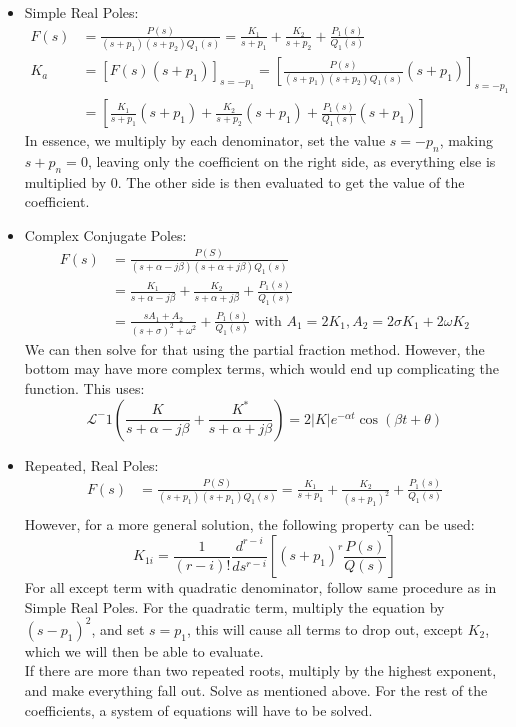 \documentclass[nobib]{tufte-handout}
\begin{document}
\begin{itemize}
    \item Simple Real Poles:
          \begin{align*}
              F(s) & = \frac{P(s)}{(s+p_1)(s+p_2)Q_1(s)} = \frac{K_1}{s+p_1}+\frac{K_2}{s+p_2}+\frac{P_1(s)}{Q_1(s)} \\
              K_a  & = [F(s)(s+p_1)]_{s=-p_1} = \left[ \frac{P(s)}{(s+p_1)(s+p_2)Q_1(s)}(s+p_1)\right]_{s=-p_1}      \\
                   & = \left[\frac{K_1}{s+p_1}(s+p_1)+\frac{K_2}{s+p_2}(s+p_1)+\frac{P_1(s)}{Q_1(s)}(s+p_1)\right]
          \end{align*}
          In essence, we multiply by each denominator, set the value $s=-p_n$, making $s+p_n=0$, leaving only the coefficient on the right side, as everything else is multiplied by 0. The other side is then evaluated to get the value of the coefficient.
    \item Complex Conjugate Poles:
          \begin{align*}
              F(s) & = \frac{P(S)}{(s+\alpha - j\beta)(s+\alpha + j\beta)Q_1(s)}                                                        \\
                   & = \frac{K_1}{s+\alpha - j\beta}+\frac{K_2}{s+\alpha +j\beta}+\frac{P_1(s)}{Q_1(s)}                                 \\
                   & = \frac{sA_1+A_2}{(s+\sigma)^2+\omega^2}+\frac{P_1(s)}{Q_1(s)} \text{ with } A_1=2K_1, A_2=2\sigma K_1+2\omega K_2
          \end{align*}
          We can then solve for that using the partial fraction method. However, the bottom may have more complex terms, which would end up complicating the function.
          This uses:
          \begin{equation*}
              \mathcal{L}^-1\left(\frac{K}{s+\alpha - j\beta}+\frac{K^*}{s+\alpha +j\beta}\right) = 2|K|e^{-\alpha t} \cos(\beta t +\theta)
          \end{equation*}
    \item Repeated, Real Poles:
          \begin{align*}
              F(s) & = \frac{P(S)}{(s+p_1)(s+p_1)Q_1(s)} = \frac{K_1}{s+p_1}+\frac{K_2}{(s+p_1)^2}+\frac{P_1(s)}{Q_1(s)} \\
          \end{align*}
          However, for a more general solution, the following property can be used:
          \begin{equation*}
              K_{1i}= \frac{1}{(r-i)!}\frac{d^{r-i}}{ds^{r-i}}\left[ (s+p_1)^r \frac{P(s)}{Q(s)}\right]
          \end{equation*}
          For all except term with quadratic denominator, follow same procedure as in Simple Real Poles. For the quadratic term, multiply the equation by $(s-p_1)^2$, and set $s=p_1$, this will cause all terms to drop out, except $K_2$, which we will then be able to evaluate.\\
          If there are more than two repeated roots, multiply by the highest exponent, and make everything fall out. Solve as mentioned above. For the rest of the coefficients, a system of equations will have to be solved.
\end{itemize}
\end{document}
